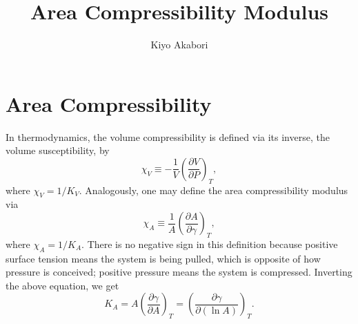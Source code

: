 \documentclass[letterpaper,12pt]{article}
\author{Kiyo Akabori}
\title{Area Compressibility Modulus}
\begin{document}




\section{Area Compressibility}
In thermodynamics, the volume compressibility is defined via its inverse, 
the volume susceptibility, by
\begin{equation}
  \chi_V \equiv -\frac{1}{V}\left( \frac{\partial V}{\partial P} \right)_T,
\end{equation}
where $\chi_V=1/K_V$. Analogously, one may define the area compressibility 
modulus via
\begin{equation}
  \chi_A \equiv \frac{1}{A}\left( \frac{\partial A}{\partial\gamma} \right)_T,
\end{equation}
where $\chi_A=1/K_A$. There is no negative sign in this definition because 
positive surface tension means the system is being pulled, which is opposite of 
how pressure is conceived; positive pressure means the system is compressed. 
Inverting the above equation, we get
\begin{equation}
  K_A = A\left(\frac{\partial\gamma}{\partial A}\right)_T 
  = \left(\frac{\partial\gamma}{\partial(\ln A)}\right)_T.
\end{equation}
\end{document}
